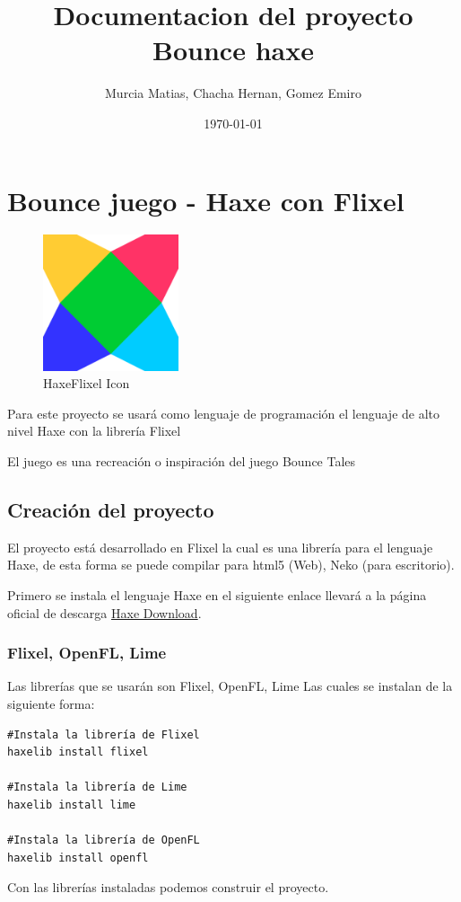 \documentclass[11pt]{article}
\author{Murcia Matias, Chacha Hernan, Gomez Emiro}
\date{\today}
\title{Documentacion del proyecto Bounce haxe}
\begin{document}
\maketitle
\tableofcontents

\section{Bounce juego - Haxe con Flixel}
\label{sec:orgcfd5092}

\begin{figure}[htbp]
\centering
\includegraphics[width=4cm]{./img/haxeflixel.png}
\caption{\label{fig:HaxeFlixel}HaxeFlixel Icon}
\end{figure}

Para este proyecto se usará como lenguaje de programación
el lenguaje de alto nivel \guillemotleft{}Haxe\guillemotright{} con la librería \guillemotleft{}Flixel\guillemotright{}

El juego es una recreación o inspiración del juego \guillemotleft{}Bounce Tales\guillemotright{}

\subsection{Creación del proyecto}
\label{sec:org4b04bba}
El proyecto está desarrollado en \guillemotleft{}Flixel\guillemotright{} la cual es una librería para
el lenguaje \guillemotleft{}Haxe\guillemotright{}, de esta forma se puede compilar para html5 (Web), Neko (para escritorio).

Primero se instala el lenguaje \guillemotleft{}Haxe\guillemotright{} en el siguiente enlace llevará a la página oficial
de descarga \href{https://haxe.org/download/}{Haxe Download}.

\subsubsection{Flixel, OpenFL, Lime}
\label{sec:org1c868bc}
Las librerías que se usarán son Flixel, OpenFL, Lime
Las cuales se instalan de la siguiente forma:
\begin{verbatim}
#Instala la librería de Flixel
haxelib install flixel

#Instala la librería de Lime
haxelib install lime

#Instala la librería de OpenFL
haxelib install openfl
\end{verbatim}
Con las librerías instaladas podemos construir el proyecto.
\end{document}
